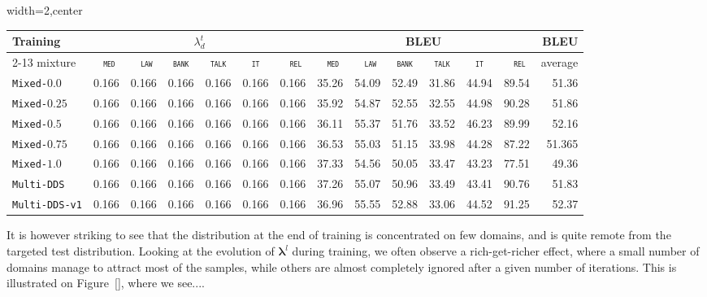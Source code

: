 \documentclass[11pt,a4paper]{article}
\newcommand{\fyTodo}[1]{\Todo[FY:]{\textcolor{orange}{#1}}}
\newcommand{\domain}[1]{\texttt{\textsc{#1}}}
\newcommand{\system}[1]{\texttt{{#1}}}
\newcommand{\vlambda}{\ensuremath{\boldsymbol\lambda}\xspace} %
\begin{document}
\begin{table}
  \centering%
  \begin{adjustbox}{width=2\columnwidth,center}
  \begin{tabular}{|p{3.0cm}|*{13}{r|}} \hline
    \multirow{2}{*}{Training} & \multicolumn{6}{|c}{$\lambda^t_d$} & \multicolumn{6}{|c|}{BLEU} & \multirow{2}{*}{BLEU} \\ \cline{2-13}	
  mixture & \multicolumn{1}{c|}{\domain{ med}} & \multicolumn{1}{c|}{\domain{ law}} & \multicolumn{1}{c|}{\domain{bank}} & \multicolumn{1}{c|}{\domain{talk}} & \multicolumn{1}{c|}{\domain{ it }} & \multicolumn{1}{c|}{\domain{ rel}} & \multicolumn{1}{c|}{\domain{ med}} & \multicolumn{1}{c|}{\domain{ law}} & \multicolumn{1}{c|}{\domain{bank}} & \multicolumn{1}{c|}{\domain{talk}} & \multicolumn{1}{c|}{\domain{ it }} & \multicolumn{1}{c|}{\domain{ rel}} & average \\
    \hline
  \system{Mixed-$0.0$} & 0.166&0.166 &0.166 &0.166 &0.166 & 0.166 & 35.26 &54.09 &52.49& 31.86& 44.94& 89.54& 51.36\\
  \system{Mixed-$0.25$} & 0.166&0.166 &0.166 &0.166 &0.166 & 0.166 &35.92& 54.87& 52.55& 32.55& 44.98& 90.28& 51.86\\
  \system{Mixed-$0.5$} & 0.166&0.166 &0.166 &0.166 &0.166 & 0.166 &36.11& 55.37& 51.76& 33.52& 46.23& 89.99& 52.16\\
  \system{Mixed-$0.75$} & 0.166&0.166 &0.166 &0.166 &0.166 & 0.166 &36.53&	55.03& 51.15& 33.98& 44.28& 87.22& 51.365\\
  \system{Mixed-$1.0$} & 0.166&0.166 &0.166 &0.166 &0.166 & 0.166 &37.33& 54.56& 50.05& 33.47& 43.23& 77.51& 49.36\\
  \system{Multi-DDS} & 0.166&0.166 &0.166 &0.166 &0.166 & 0.166 & 37.26 & 55.07&50.96&33.49&43.41&90.76& 51.83 \\
  \system{Multi-DDS-v1} & 0.166&0.166 &0.166 &0.166 &0.166 & 0.166 & 36.96 & 55.55 & 52.88 & 33.06 & 44.52 &91.25 & 52.37\\
  \hline
  \end{tabular}
\end{adjustbox}
  \label{tab:multidomains}
\end{table}

It is however striking to see that the distribution at the end of training is concentrated on few domains, and is quite remote from the targeted test distribution. Looking at the evolution of $\vlambda^l$ during training, we often observe a rich-get-richer effect, where a small number of domains manage to attract most of the samples, while others are almost completely ignored after a given number of iterations. This is illustrated on Figure~\ref{}, where we see....\fyTodo{Give illustration and numbers}
\end{document}
